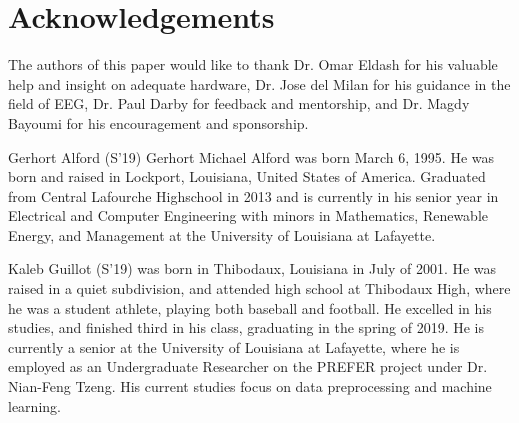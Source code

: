 \documentclass[conference]{IEEEtran}
\begin{document}
    

\section*{Acknowledgements}
The authors of this paper would like to thank Dr. Omar Eldash for his valuable help and insight on adequate hardware, Dr. Jose del Milan for his guidance in the field of EEG, Dr. Paul Darby for feedback and mentorship, and Dr. Magdy Bayoumi for his encouragement and sponsorship.  




\newpage
\begin{IEEEbiography}
    {Gerhort Alford}
    (S'19) Gerhort Michael Alford was born March 6, 1995. He was born and raised in Lockport, Louisiana, United States of America. Graduated from Central Lafourche Highschool in 2013 and is currently in his senior year in Electrical and Computer Engineering with minors in Mathematics, Renewable Energy, and Management at the University of Louisiana at Lafayette.
\end{IEEEbiography}
\vspace{-100mm}
\begin{IEEEbiography}{Kaleb Guillot}
(S'19) was born in Thibodaux, Louisiana in July of 2001. He was raised in a quiet subdivision, and attended high school at Thibodaux High, where he was a student athlete, playing both baseball and football. He excelled in his studies, and finished third in his class, graduating in the spring of 2019. He is currently a senior at the University of Louisiana at Lafayette, where he is employed as an Undergraduate Researcher on the PREFER project under Dr. Nian-Feng Tzeng. His current studies focus on data preprocessing and machine learning. 
\end{IEEEbiography}
\end{document}
